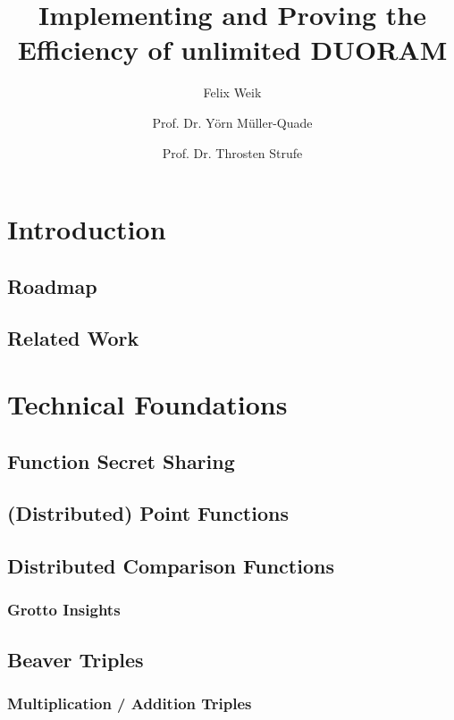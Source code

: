 \documentclass[fleqn,10pt]{olplainarticle}
\title{Implementing and Proving the Efficiency of unlimited DUORAM}
\author[1]{Felix Weik}
\author[2]{Prof. Dr. Yörn Müller-Quade}
\author[3]{Prof. Dr. Throsten Strufe}
\begin{document}
\flushbottom
\maketitle

\thispagestyle{empty}

\tableofcontents

\section{Introduction}
\subsection{Roadmap}
\subsection{Related Work}

\section{Technical Foundations}
\subsection{Function Secret Sharing}

\subsection{(Distributed) Point Functions}

\subsection{Distributed Comparison Functions}

\subsubsection{Grotto Insights}

\subsection{Beaver Triples}

\subsubsection{Multiplication / Addition Triples}

\end{document}
